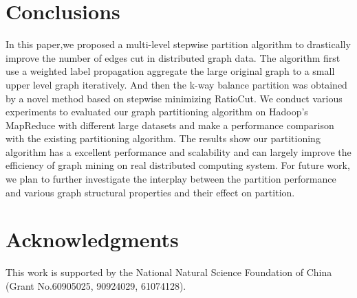 \documentclass{acm_proc_article-sp}
\begin{document}
\section{Conclusions}
In this paper,we proposed a multi-level stepwise partition algorithm to drastically improve the number of edges cut in distributed graph data. The algorithm first use a weighted label propagation aggregate the large original graph to a small upper level graph iteratively. And then the k-way balance partition was obtained by a novel method based on stepwise minimizing RatioCut. We conduct various experiments to evaluated our graph partitioning algorithm on Hadoop's MapReduce with different large datasets and make a performance comparison with the existing partitioning algorithm. The results show our partitioning algorithm has a excellent performance and scalability and can largely improve the efficiency of graph mining on real distributed computing system. For future work, we plan to further investigate the interplay between the partition performance and various graph structural properties and their effect on partition.

\section{Acknowledgments}
This work is supported by the National Natural Science Foundation of China (Grant No.60905025, 90924029, 61074128).

%

%
%
\balancecolumns
\end{document}
